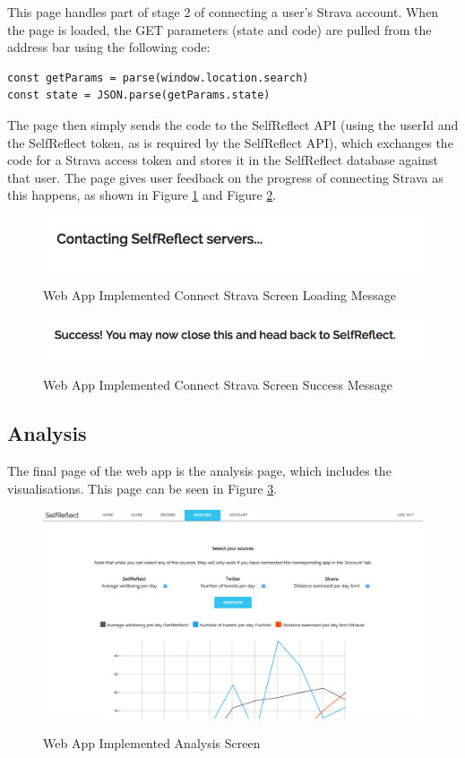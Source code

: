 \documentclass[11pt,openright,a4paper]{report}
\begin{document}
This page handles part of stage 2 of connecting a user's Strava account. When the page is loaded, the GET parameters (state and code) are pulled from the address bar using the following code:
\begin{lstlisting}
const getParams = parse(window.location.search)
const state = JSON.parse(getParams.state)
\end{lstlisting}

The page then simply sends the code to the SelfReflect API (using the userId and the SelfReflect token, as is required by the SelfReflect API), which exchanges the code for a Strava access token and stores it in the SelfReflect database against that user. The page gives user feedback on the progress of connecting Strava as this happens, as shown in Figure \ref{fig:webstravaloading} and Figure \ref{fig:webstravasuccess}.

\begin{figure}[ht]
\centering
\caption{Web App Implemented Connect Strava Screen Loading Message}
\includegraphics[width=.75\textwidth]{i/webstravaloading.png}
\label{fig:webstravaloading}
\end{figure}

\begin{figure}[ht]
\centering
\caption{Web App Implemented Connect Strava Screen Success Message}
\includegraphics[width=.75\textwidth]{i/webstravasuccess.png}
\label{fig:webstravasuccess}
\end{figure}

\subsection{Analysis}
The final page of the web app is the analysis page, which includes the visualisations. This page can be seen in Figure \ref{fig:webanalysisimpl}.

\begin{figure}[ht]
\centering
\caption{Web App Implemented Analysis Screen}
\includegraphics[width=\textwidth]{i/webanalysisimpl.png}
\label{fig:webanalysisimpl}
\end{figure}
\end{document}

